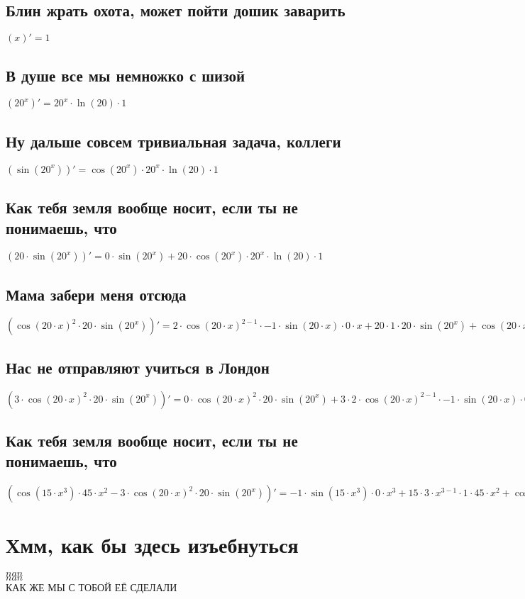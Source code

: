 \documentclass[12pt]{article}
\begin{document}
\subsection{Блин жрать охота, может пойти дошик заварить}
$(x)' = 1$
\subsection{В душе все мы немножко с шизой}
$(20^{x})' = 20^{x} \cdot \ln(20) \cdot 1$
\subsection{Ну дальше совсем тривиальная задача, коллеги}
$(\sin(20^{x}))' = \cos(20^{x}) \cdot 20^{x} \cdot \ln(20) \cdot 1$
\subsection{Как тебя земля вообще носит, если ты не понимаешь, что}
$(20 \cdot \sin(20^{x}))' = 0 \cdot \sin(20^{x}) + 20 \cdot \cos(20^{x}) \cdot 20^{x} \cdot \ln(20) \cdot 1$
\subsection{Мама забери меня отсюда}
$(\cos(20 \cdot x)^{2} \cdot 20 \cdot \sin(20^{x}))' = 2 \cdot \cos(20 \cdot x)^{2 - 1} \cdot -1 \cdot \sin(20 \cdot x) \cdot 0 \cdot x + 20 \cdot 1 \cdot 20 \cdot \sin(20^{x}) + \cos(20 \cdot x)^{2} \cdot 0 \cdot \sin(20^{x}) + 20 \cdot \cos(20^{x}) \cdot 20^{x} \cdot \ln(20) \cdot 1$
\subsection{Нас не отправляют учиться в Лондон}
$(3 \cdot \cos(20 \cdot x)^{2} \cdot 20 \cdot \sin(20^{x}))' = 0 \cdot \cos(20 \cdot x)^{2} \cdot 20 \cdot \sin(20^{x}) + 3 \cdot 2 \cdot \cos(20 \cdot x)^{2 - 1} \cdot -1 \cdot \sin(20 \cdot x) \cdot 0 \cdot x + 20 \cdot 1 \cdot 20 \cdot \sin(20^{x}) + \cos(20 \cdot x)^{2} \cdot 0 \cdot \sin(20^{x}) + 20 \cdot \cos(20^{x}) \cdot 20^{x} \cdot \ln(20) \cdot 1$
\subsection{Как тебя земля вообще носит, если ты не понимаешь, что}
$(\cos(15 \cdot x^{3}) \cdot 45 \cdot x^{2} - 3 \cdot \cos(20 \cdot x)^{2} \cdot 20 \cdot \sin(20^{x}))' = -1 \cdot \sin(15 \cdot x^{3}) \cdot 0 \cdot x^{3} + 15 \cdot 3 \cdot x^{3 - 1} \cdot 1 \cdot 45 \cdot x^{2} + \cos(15 \cdot x^{3}) \cdot 0 \cdot x^{2} + 45 \cdot 2 \cdot x^{2 - 1} \cdot 1 - 0 \cdot \cos(20 \cdot x)^{2} \cdot 20 \cdot \sin(20^{x}) + 3 \cdot 2 \cdot \cos(20 \cdot x)^{2 - 1} \cdot -1 \cdot \sin(20 \cdot x) \cdot 0 \cdot x + 20 \cdot 1 \cdot 20 \cdot \sin(20^{x}) + \cos(20 \cdot x)^{2} \cdot 0 \cdot \sin(20^{x}) + 20 \cdot \cos(20^{x}) \cdot 20^{x} \cdot \ln(20) \cdot 1$
\section{Хмм, как бы здесь изъебнуться}
$nan$\\
$nan$\\
КАК ЖЕ МЫ С ТОБОЙ ЕЁ СДЕЛАЛИ
\end{document}
